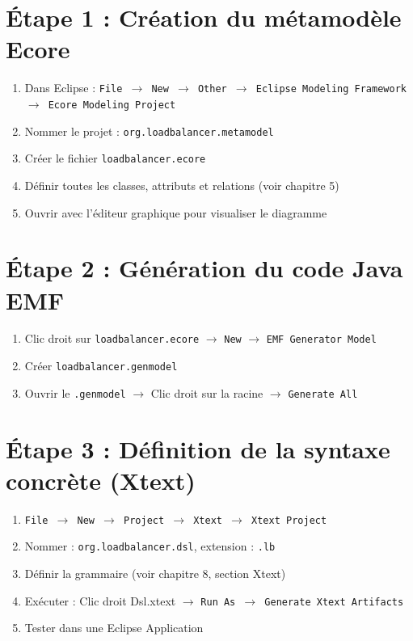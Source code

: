 \documentclass[12pt,a4paper]{report}
\begin{document}
\section{Étape 1 : Création du métamodèle Ecore}

\begin{enumerate}
  \item Dans Eclipse : \texttt{File $\rightarrow$ New $\rightarrow$ Other $\rightarrow$ Eclipse Modeling Framework $\rightarrow$ Ecore Modeling Project}
  \item Nommer le projet : \texttt{org.loadbalancer.metamodel}
  \item Créer le fichier \texttt{loadbalancer.ecore}
  \item Définir toutes les classes, attributs et relations (voir chapitre 5)
  \item Ouvrir avec l'éditeur graphique pour visualiser le diagramme
\end{enumerate}

\section{Étape 2 : Génération du code Java EMF}

\begin{enumerate}
  \item Clic droit sur \texttt{loadbalancer.ecore} $\rightarrow$ \texttt{New} $\rightarrow$ \texttt{EMF Generator Model}
  \item Créer \texttt{loadbalancer.genmodel}
  \item Ouvrir le \texttt{.genmodel} $\rightarrow$ Clic droit sur la racine $\rightarrow$ \texttt{Generate All}
\end{enumerate}

\section{Étape 3 : Définition de la syntaxe concrète (Xtext)}

\begin{enumerate}
  \item \texttt{File $\rightarrow$ New $\rightarrow$ Project $\rightarrow$ Xtext $\rightarrow$ Xtext Project}
  \item Nommer : \texttt{org.loadbalancer.dsl}, extension : \texttt{.lb}
  \item Définir la grammaire (voir chapitre 8, section Xtext)
  \item Exécuter : Clic droit Dsl.xtext $\rightarrow$ \texttt{Run As $\rightarrow$ Generate Xtext Artifacts}
  \item Tester dans une Eclipse Application
\end{enumerate}
\end{document}
